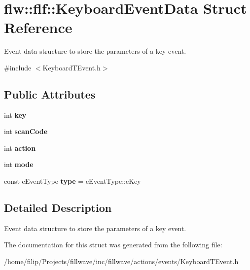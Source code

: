 \hypertarget{structflw_1_1flf_1_1KeyboardEventData}{}\section{flw\+:\+:flf\+:\+:Keyboard\+Event\+Data Struct Reference}
\label{structflw_1_1flf_1_1KeyboardEventData}


Event data structure to store the parameters of a key event.  




{\ttfamily \#include $<$Keyboard\+T\+Event.\+h$>$}

\subsection*{Public Attributes}
\begin{DoxyCompactItemize}
\item 
int {\bfseries key}\hypertarget{structflw_1_1flf_1_1KeyboardEventData_a2eee2bc4f3f58cdf4009b0677dacd0cc}{}\label{structflw_1_1flf_1_1KeyboardEventData_a2eee2bc4f3f58cdf4009b0677dacd0cc}

\item 
int {\bfseries scan\+Code}\hypertarget{structflw_1_1flf_1_1KeyboardEventData_acd8697357c1dcfeca37bda6b6ba19eee}{}\label{structflw_1_1flf_1_1KeyboardEventData_acd8697357c1dcfeca37bda6b6ba19eee}

\item 
int {\bfseries action}\hypertarget{structflw_1_1flf_1_1KeyboardEventData_a306c515779fc9bf90b019a4fe4a51b97}{}\label{structflw_1_1flf_1_1KeyboardEventData_a306c515779fc9bf90b019a4fe4a51b97}

\item 
int {\bfseries mode}\hypertarget{structflw_1_1flf_1_1KeyboardEventData_a022d96d5b0d3c683193e0ad1afbe39ef}{}\label{structflw_1_1flf_1_1KeyboardEventData_a022d96d5b0d3c683193e0ad1afbe39ef}

\item 
const e\+Event\+Type {\bfseries type} = e\+Event\+Type\+::e\+Key\hypertarget{structflw_1_1flf_1_1KeyboardEventData_acc0cc77adf02ddae2f0dc1b340b82a1c}{}\label{structflw_1_1flf_1_1KeyboardEventData_acc0cc77adf02ddae2f0dc1b340b82a1c}

\end{DoxyCompactItemize}


\subsection{Detailed Description}
Event data structure to store the parameters of a key event. 

The documentation for this struct was generated from the following file\+:\begin{DoxyCompactItemize}
\item 
/home/filip/\+Projects/fillwave/inc/fillwave/actions/events/Keyboard\+T\+Event.\+h\end{DoxyCompactItemize}
